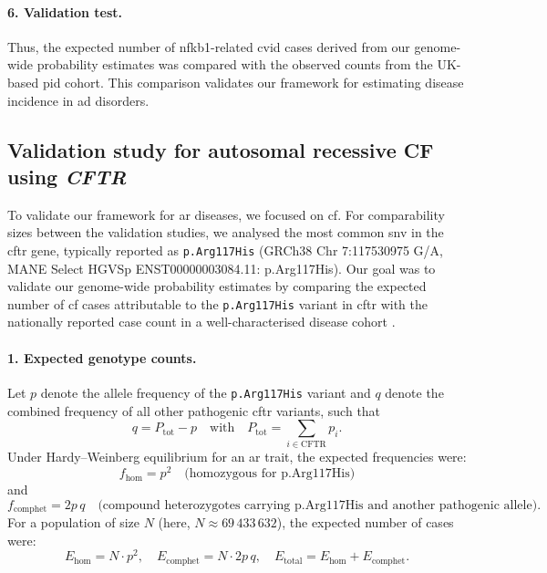 \paragraph{6. Validation test.}
Thus, the expected number of \ac{nfkb1}-related \ac{cvid} cases derived from our genome-wide probability estimates was compared with the observed counts from the UK-based \ac{pid} cohort. 
This comparison validates our framework for estimating disease incidence in \ac{ad} disorders.


\subsection{Validation study for autosomal recessive CF using \textit{CFTR}}

To validate our framework for \ac{ar} diseases, we focused on \ac{cf}.
For comparability sizes between the validation studies, we analysed the most common \ac{snv} in the \ac{cftr} gene, typically reported as \texttt{p.Arg117His} (GRCh38 Chr 7:117530975 G/A, MANE Select HGVSp ENST00000003084.11: p.Arg117His).
Our goal was to validate our genome-wide probability estimates by comparing the expected number of \ac{cf} cases attributable to the \texttt{p.Arg117His} variant in \ac{cftr} with the nationally reported case count in a well-characterised disease cohort
\cite{naito2023uk, castellani2013cftr2, Grasemann2023cftr}.

\paragraph{1. Expected genotype counts.}
Let \( p \) denote the allele frequency of the \texttt{p.Arg117His} variant and \( q \) denote the combined frequency of all other pathogenic \ac{cftr} variants, such that
\[
q = P_{\text{tot}} - p \quad \text{with} \quad P_{\text{tot}} = \sum_{i \in \text{CFTR}} p_i.
\]
Under Hardy–Weinberg equilibrium for an \ac{ar} trait, the expected frequencies were:
\[
f_{\text{hom}} = p^2 \quad \text{(homozygous for p.Arg117His)}
\]
and
\[
f_{\text{comphet}} = 2p\,q \quad \text{(compound heterozygotes carrying p.Arg117His and another pathogenic allele)}.
\]
For a population of size \( N \) (here, \( N \approx 69\,433\,632 \)), the expected number of cases were:
\[
E_{\text{hom}} = N \cdot p^2,\quad E_{\text{comphet}} = N \cdot 2p\,q,\quad E_{\text{total}} = E_{\text{hom}} + E_{\text{comphet}}.
\]

